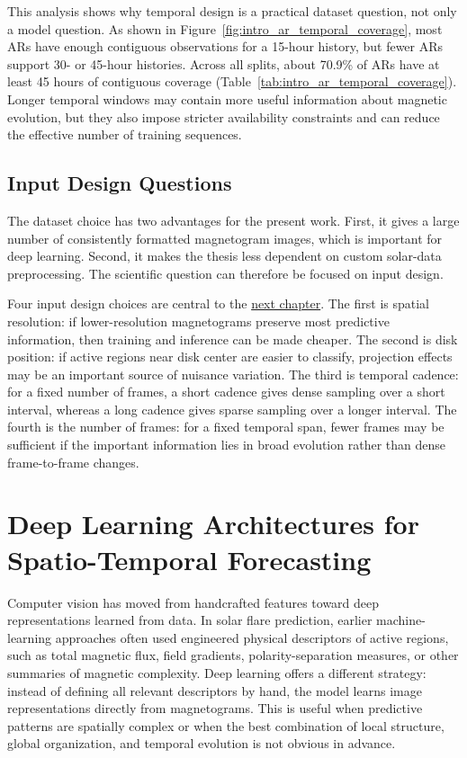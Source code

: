 This analysis shows why temporal design is a practical dataset question, not only a model question. As shown in Figure~\ref{fig:intro_ar_temporal_coverage}, most ARs have enough contiguous observations for a 15-hour history, but fewer ARs support 30- or 45-hour histories. Across all splits, about 70.9\% of ARs have at least 45 hours of contiguous coverage (Table~\ref{tab:intro_ar_temporal_coverage}). Longer temporal windows may contain more useful information about magnetic evolution, but they also impose stricter availability constraints and can reduce the effective number of training sequences.
\subsection{Input Design Questions}

The dataset choice has two advantages for the present work. First, it gives a large number of consistently formatted magnetogram images, which is important for deep learning. Second, it makes the thesis less dependent on custom solar-data preprocessing. The scientific question can therefore be focused on input design.

Four input design choices are central to the \hyperref[chap:article1]{next chapter}. The first is spatial resolution: if lower-resolution magnetograms preserve most predictive information, then training and inference can be made cheaper. The second is disk position: if active regions near disk center are easier to classify, projection effects may be an important source of nuisance variation. The third is temporal cadence: for a fixed number of frames, a short cadence gives dense sampling over a short interval, whereas a long cadence gives sparse sampling over a longer interval. The fourth is the number of frames: for a fixed temporal span, fewer frames may be sufficient if the important information lies in broad evolution rather than dense frame-to-frame changes.

\section{Deep Learning Architectures for Spatio-Temporal Forecasting}

Computer vision has moved from handcrafted features toward deep representations learned from data. In solar flare prediction, earlier machine-learning approaches often used engineered physical descriptors of active regions, such as total magnetic flux, field gradients, polarity-separation measures, or other summaries of magnetic complexity. Deep learning offers a different strategy: instead of defining all relevant descriptors by hand, the model learns image representations directly from magnetograms. This is useful when predictive patterns are spatially complex or when the best combination of local structure, global organization, and temporal evolution is not obvious in advance.

